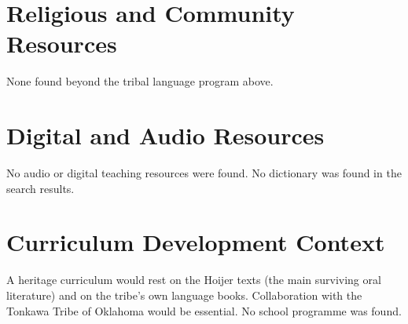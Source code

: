 \documentclass[12pt]{article}
\begin{document}
\section{Religious and Community Resources}
None found beyond the tribal language program above.

\section{Digital and Audio Resources}
No audio or digital teaching resources were found. No dictionary was found in the search results.

\section{Curriculum Development Context}
A heritage curriculum would rest on the Hoijer texts (the main surviving oral literature) and on the tribe's own language books. Collaboration with the Tonkawa Tribe of Oklahoma would be essential. No school programme was found.
\end{document}
